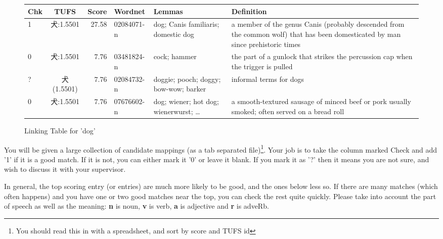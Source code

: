 \documentclass[11pt]{article}
\begin{document}
\begin{figure}[htpb]
  \centering
\begin{tabular}{lcrlp{3cm}p{5cm}}
Chk &     TUFS & Score & Wordnet & Lemmas & Definition \\ \hline
1 &    犬:1.5501 &  27.58 & 02084071-n & dog; Canis familiaris;
                                           domestic dog & 	a member of
                                                          the genus Canis
                                                          (probably
                                                          descended from
                                                          the common wolf)
                                                          that has been
                                                          domesticated by
                                                          man since
                                                          prehistoric
                                                          times  \\
 0 &   犬:1.5501 &  7.76 & 03481824-n &  cock; hammer &	the part of a gunlock that strikes the percussion cap when the trigger is pulled\\
  ? &  犬 (1.5501) & 7.76 & 02084732-n & doggie; pooch; doggy; bow-wow;
                                          barker &	informal terms for dogs		\\
  0 &  犬:1.5501 &  7.76 & 07676602-n &dog; wiener; hot dog;
                                             wienerwurst; \ldots
                                             & a smooth-textured sausage of minced beef or pork usually smoked; often served on a bread roll	\\
  \end{tabular}
  
  \caption{Linking Table for 'dog'}
  \label{fig:linking}
\end{figure}


You will be given a large collection of candidate mappings (as a tab
separated file)\footnote{You should read this in with a spreadsheet,
  and sort by score and TUFS id}.  Your job
is to take the column marked Check and add '1' if it is a good match.
If it is not, you can either mark it '0' or leave it blank.  If you
mark it as '?' then it means you are not sure, and wish to discuss it
with your supervisor.    


In general, the top scoring entry (or entries) are much more likely to
be good, and the ones below less so.  If there are many matches (which
often happens) and you have one or two good matches near the top, you
can check the rest quite quickly.  Please take into account the part
of speech as well as the meaning: \textbf{n} is noun, \textbf{v} is
verb, \textbf{a} is adjective and \textbf{r} is adveRb.
\end{document}
